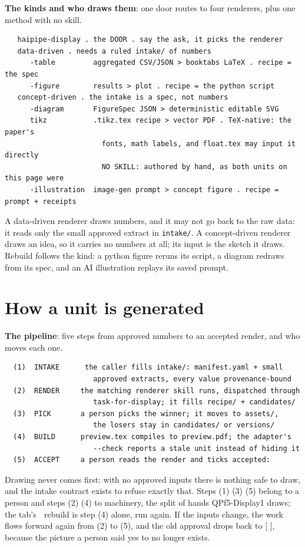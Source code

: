 \textbf{The kinds and who draws them}: one door routes to four renderers, plus one method with no skill.

\begin{verbatim}
   haipipe-display . the DOOR . say the ask, it picks the renderer
   data-driven . needs a ruled intake/ of numbers
      -table         aggregated CSV/JSON > booktabs LaTeX . recipe = the spec
      -figure        results > plot . recipe = the python script
   concept-driven . the intake is a spec, not numbers
      -diagram       FigureSpec JSON > deterministic editable SVG
      tikz           .tikz.tex recipe > vector PDF . TeX-native: the paper's
                       fonts, math labels, and float.tex may input it directly
                       NO SKILL: authored by hand, as both units on this page were
      -illustration  image-gen prompt > concept figure . recipe = prompt + receipts
\end{verbatim}
A data-driven renderer draws numbers, and it may not go back to the raw data: it reads only the small approved extract in \texttt{intake/}. A concept-driven renderer draws an idea, so it carries no numbers at all; its input is the sketch it draws. Rebuild follows the kind: a python figure reruns its script, a diagram redraws from its spec, and an AI illustration replays its saved prompt.


\section{How a unit is generated}
\textbf{The pipeline}: five steps from approved numbers to an accepted render, and who moves each one.

\begin{verbatim}
  (1)  INTAKE      the caller fills intake/: manifest.yaml + small
                     approved extracts, every value provenance-bound
  (2)  RENDER     the matching renderer skill runs, dispatched through
                     task-for-display; it fills recipe/ + candidates/
  (3)  PICK       a person picks the winner; it moves to assets/,
                     the losers stay in candidates/ or versions/
  (4)  BUILD      preview.tex compiles to preview.pdf; the adapter's
                     --check reports a stale unit instead of hiding it
  (5)  ACCEPT     a person reads the render and ticks accepted:
\end{verbatim}
Drawing never comes first: with no approved inputs there is nothing safe to draw, and the intake contract exists to refuse exactly that. Steps (1) (3) (5) belong to a person and steps (2) (4) to machinery, the split of hands QPf5-Display1 draws; the tab's 🔄 rebuild is step (4) alone, run again. If the inputs change, the work flows forward again from (2) to (5), and the old approval drops back to [ ], because the picture a person said yes to no longer exists.

